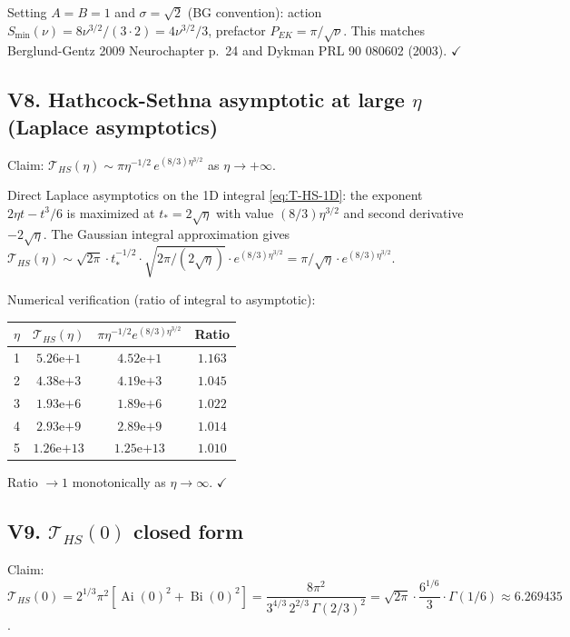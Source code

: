 \documentclass[11pt,a4paper]{article}
\theoremstyle{plain}
\theoremstyle{definition}
\newcommand{\Ai}{\operatorname{Ai}}
\newcommand{\Bi}{\operatorname{Bi}}
\begin{document}
Setting $A = B = 1$ and $\sigma = \sqrt{2}$ (BG convention): action $S_{\min}(\nu) = 8\nu^{3/2}/(3\cdot 2) = 4\nu^{3/2}/3$, prefactor $P_{EK} = \pi/\sqrt\nu$. This matches Berglund-Gentz 2009 Neurochapter p.~24 and Dykman PRL 90 080602 (2003). $\checkmark$

\subsection*{V8. Hathcock-Sethna asymptotic at large $\eta$ (Laplace asymptotics)}

Claim: $\mathcal T_{HS}(\eta) \sim \pi\eta^{-1/2}\,e^{(8/3)\eta^{3/2}}$ as $\eta \to +\infty$.

Direct Laplace asymptotics on the 1D integral \eqref{eq:T-HS-1D}: the exponent $2\eta t - t^3/6$ is maximized at $t_* = 2\sqrt\eta$ with value $(8/3)\eta^{3/2}$ and second derivative $-2\sqrt\eta$. The Gaussian integral approximation gives $\mathcal T_{HS}(\eta) \sim \sqrt{2\pi}\cdot t_*^{-1/2}\cdot\sqrt{2\pi/(2\sqrt\eta)}\cdot e^{(8/3)\eta^{3/2}} = \pi/\sqrt\eta\cdot e^{(8/3)\eta^{3/2}}$.

Numerical verification (ratio of integral to asymptotic):

\begin{center}
\begin{tabular}{cccc}
\toprule
$\eta$ & $\mathcal T_{HS}(\eta)$ & $\pi\eta^{-1/2}e^{(8/3)\eta^{3/2}}$ & Ratio \\
\midrule
1 & $5.26\mathrm{e}{+1}$ & $4.52\mathrm{e}{+1}$ & $1.163$ \\
2 & $4.38\mathrm{e}{+3}$ & $4.19\mathrm{e}{+3}$ & $1.045$ \\
3 & $1.93\mathrm{e}{+6}$ & $1.89\mathrm{e}{+6}$ & $1.022$ \\
4 & $2.93\mathrm{e}{+9}$ & $2.89\mathrm{e}{+9}$ & $1.014$ \\
5 & $1.26\mathrm{e}{+13}$ & $1.25\mathrm{e}{+13}$ & $1.010$ \\
\bottomrule
\end{tabular}
\end{center}
Ratio $\to 1$ monotonically as $\eta \to \infty$. $\checkmark$

\subsection*{V9. $\mathcal T_{HS}(0)$ closed form}

Claim: $\mathcal T_{HS}(0) = 2^{1/3}\pi^2[\Ai(0)^2 + \Bi(0)^2] = \dfrac{8\pi^2}{3^{4/3}\,2^{2/3}\,\Gamma(2/3)^2} = \sqrt{2\pi}\cdot \dfrac{6^{1/6}}{3}\cdot\Gamma(1/6) \approx 6.269435$.
\end{document}
